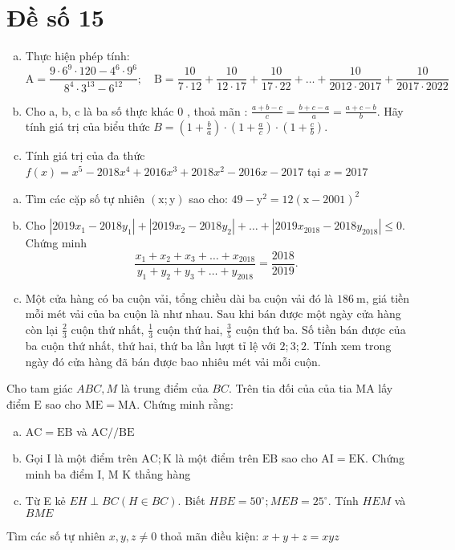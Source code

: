\onehalfspacing
\section{Đề số 15}

\begin{bt} 
    \hfill
	\begin{enumerate}[a.]
		\item Thực hiện phép tính:
        $$
        \mathrm{A}=\frac{9 \cdot 6^9 \cdot 120-4^6 \cdot 9^6}{8^4 \cdot 3^{13}-6^{12}} ; \quad \mathrm{B}=\frac{10}{7 \cdot 12}+\frac{10}{12 \cdot 17}+\frac{10}{17 \cdot 22}+\ldots+\frac{10}{2012 \cdot 2017}+\frac{10}{2017 \cdot 2022}
        $$
        \item Cho a, b, c là ba số thực khác 0 , thoả mãn : $\frac{a+b-c}{c}=\frac{b+c-a}{a}=\frac{a+c-b}{b}$.
        Hãy tính giá trị của biểu thức $B=\left(1+\frac{b}{a}\right) \cdot\left(1+\frac{a}{c}\right) \cdot\left(1+\frac{c}{b}\right)$.
        \item Tính giá trị của đa thức $f(x)=x^5-2018 x^4+2016 x^3+2018 x^2-2016 x-2017$ tại $x=2017$
	\end{enumerate}
	\loigiai{} 
\end{bt}

\begin{bt}
	\hfill
	\begin{enumerate}[a.]
		\item Tìm các cặp số tự nhiên $(\mathrm{x} ; \mathrm{y})$ sao cho: $49-\mathrm{y}^2=12(\mathrm{x}-2001)^2$
        \item Cho $\left|2019 x_1-2018 y_1\right|+\left|2019 x_2-2018 y_2\right|+\ldots+\left|2019 x_{2018}-2018 y_{2018}\right| \leq 0$. Chứng minh
        $$
        \frac{x_1+x_2+x_3+\ldots+x_{2018}}{y_1+y_2+y_3+\ldots+y_{2018}}=\frac{2018}{2019} \text {. }
        $$
        \item Một cửa hàng có ba cuộn vải, tổng chiều dài ba cuộn vải đó là $186 \mathrm{~m}$, giá tiền mỗi mét vải của ba cuộn là như nhau. Sau khi bán được một ngày cửa hàng còn lại $\frac{2}{3}$ cuộn thứ nhất, $\frac{1}{3}$ cuộn thứ hai, $\frac{3}{5}$ cuộn thứ ba. Số tiền bán được của ba cuộn thứ nhất, thứ hai, thứ ba lần lượt tỉ lệ với $2 ; 3 ; 2$. Tính xem trong ngày đó cửa hàng đã bán được bao nhiêu mét vải mỗi cuộn.
	\end{enumerate}
	\loigiai{} 
\end{bt}

\begin{bt}
	Cho tam giác $A B C, M$ là trung điểm của $B C$. Trên tia đối của của tia MA lấy điểm $\mathrm{E}$ sao cho $\mathrm{ME}=\mathrm{MA}$. Chứng minh rằng:
	\begin{enumerate}[a.]
		\item $\mathrm{AC}=\mathrm{EB}$ và $\mathrm{AC} / / \mathrm{BE}$
        \item Gọi I là một điểm trên $\mathrm{AC} ; \mathrm{K}$ là một điểm trên $\mathrm{EB}$ sao cho $\mathrm{AI}=\mathrm{EK}$. Chứng minh ba điểm I, M $\mathrm{K}$ thẳng hàng
        \item Từ E kẻ $E H \perp B C(H \in B C)$. Biết $H B E=50^{\circ} ; M E B=25^{\circ}$. Tính $H E M$ và $B M E$
    \end{enumerate}
	\loigiai{}
\end{bt}

\begin{bt}
    Tìm các số tự nhiên $x, y, z \neq 0$ thoả mãn điều kiện: $x+y+z=x y z$
\loigiai{}
\end{bt}

